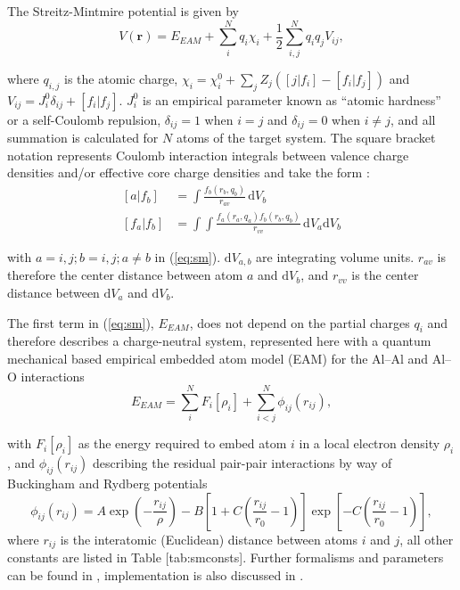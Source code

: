 The Streitz-Mintmire potential is given by
\begin{equation}
\label{eq:sm}
V(\mathbf{r}) = E_{EAM}+\sum_{i}^{N}q_i\chi_i + \frac{1}{2}\sum_{i,j}^{N}q_{i}q_{j}V_{ij},
\end{equation}

where $q_{i,j}$ is the atomic charge, $\chi_i = \chi_i^0 + \sum_{j}Z_{j}(\left[j|f_i\right]-\left[f_i|f_j\right])$ and $V_{ij} = J_{i}^{0}\delta_{ij}+\left[f_i|f_j\right]$. 
$J_i^0$ is an empirical parameter known as ``atomic hardness'' or a self-Coulomb repulsion\cite{Rappe1991}, $\delta_{ij} = 1$ when $i=j$ and $\delta_{ij} = 0$ when $i\neq j$, and all summation is calculated for $N$ atoms of the target system.
The square bracket notation represents Coulomb interaction integrals between valence charge densities and/or effective core charge densities and take the form \cite{Zhou2004}:
\begin{align}
\left[a|f_b\right] &= \int \frac{f_b(r_b,q_b)}{r_{av}}\,\mathrm{d}V_b\\
\left[f_a|f_b\right] &= \int\!\!\int \frac{f_a(r_a,q_a)f_b(r_b,q_b)}{r_{vv}}\,\mathrm{d}V_a \mathrm{d}V_b
\end{align}

with $a=i,j; b=i,j; a\neq b$ in (\cref{eq:sm}).
$\mathrm{d}V_{a,b}$ are integrating volume units.
$r_{av}$ is therefore the center distance between atom $a$ and $\mathrm{d}V_b$, and $r_{vv}$ is the center distance between $\mathrm{d}V_a$ and $\mathrm{d}V_b$.

The first term in (\cref{eq:sm}), $E_{EAM}$, does not depend on the partial charges $q_i$ and therefore describes a charge-neutral system, represented here with a quantum mechanical based empirical embedded atom model (EAM) for the Al--Al and Al--O interactions
\begin{equation}
E_{EAM} = \sum_{i}^{N}F_{i}\left[\rho_i\right]+\sum_{i<j}^{N}\phi_{ij}(r_{ij}),
\end{equation}

with $F_{i}\left[\rho_i\right]$ as the energy required to embed atom $i$ in a local electron density $\rho_i$, and $\phi_{ij}(r_{ij})$ describing the residual pair-pair interactions by way of Buckingham and Rydberg potentials
\begin{equation}
\label{eq:smpair}
\phi_{ij}(r_{ij}) = A\exp\left(-\frac{r_{ij}}{\rho}\right)-B\left[1+C\left(\frac{r_{ij}}{r_0}-1\right)\right]\exp\left[-C\left(\frac{r_{ij}}{r_0}-1\right)\right],
\end{equation}
where $r_{ij}$ is the interatomic (Euclidean) distance between atoms $i$ and $j$, all other constants are listed in Table [tab:smconsts].
Further formalisms and parameters can be found in \cite{Streitz1994,Zhou2004}, implementation is also discussed in \cite{Gale2003}.

